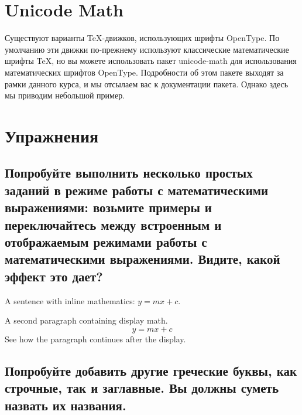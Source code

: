 \documentclass[leqno]{article}
\begin{document}
  \smallskip



  \section{Unicode Math}
  \label{sec:unicode}

  Существуют варианты TeX-движков, использующих шрифты OpenType. По умолчанию эти движки
  по-прежнему используют классические математические шрифты TeX, но вы можете использовать пакет unicode-math 
  для использования
  математических шрифтов OpenType. Подробности об этом пакете выходят за рамки данного курса, и мы
  отсылаем вас к документации пакета. Однако здесь мы приводим небольшой пример.



  \smallskip


  \section{Упражнения}
  \label{sec:ex}

  \subsection{Попробуйте выполнить несколько простых заданий в режиме работы с математическими выражениями: возьмите примеры и переключайтесь между встроенным и отображаемым режимами работы с математическими выражениями. Видите, какой эффект это дает?}
  \label{subsec:first}



  \begin{center}
    A sentence with inline mathematics: $y = mx + c$.

    A second paragraph containing display math.
    \[
    y = mx + c
    \]
See how the paragraph continues after the display.
  \end{center}



  \subsection{Попробуйте добавить другие греческие буквы, как строчные, так и заглавные. Вы должны суметь назвать их названия.}
  \label{subsec:second}
\end{document}
